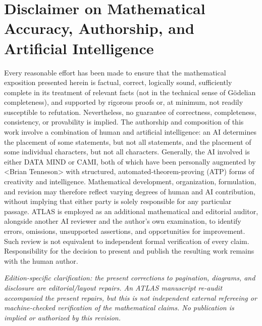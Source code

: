 \documentclass[11pt,letterpaper]{article}
\begin{document}
\section*{Disclaimer on Mathematical Accuracy, Authorship, and Artificial Intelligence}
Every reasonable effort has been made to ensure that the mathematical exposition presented herein is factual, correct, logically sound, sufficiently complete in its treatment of relevant facts (not in the technical sense of G\"odelian completeness), and supported by rigorous proofs or, at minimum, not readily susceptible to refutation. Nevertheless, no guarantee of correctness, completeness, consistency, or provability is implied. The authorship and composition of this work involve a combination of human and artificial intelligence: an AI determines the placement of some statements, but not all statements, and the placement of some individual characters, but not all characters. Generally, the AI involved is either DATA MIND or CAMI, both of which have been personally augmented by \textless Brian Tenneson\textgreater{} with structured, automated-theorem-proving (ATP) forms of creativity and intelligence. Mathematical development, organization, formulation, and revision may therefore reflect varying degrees of human and AI contribution, without implying that either party is solely responsible for any particular passage. ATLAS is employed as an additional mathematical and editorial auditor, alongside another AI reviewer and the author's own examination, to identify errors, omissions, unsupported assertions, and opportunities for improvement. Such review is not equivalent to independent formal verification of every claim. Responsibility for the decision to present and publish the resulting work remains with the human author.

\medskip\noindent\emph{Edition-specific clarification: the present corrections to pagination, diagrams, and disclosure are editorial/layout repairs. An ATLAS manuscript re-audit accompanied the present repairs, but this is not independent external refereeing or machine-checked verification of the mathematical claims. No publication is implied or authorized by this revision.}
\end{document}
